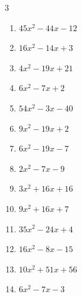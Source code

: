 \begin{multicols}{3}
\begin{enumerate}
  \item $45x^{2}-44x-12$

        \phantom{$=(5x-6)(9x+2)$}

  \item $16x^{2}-14x+3$

        \phantom{$=(2x-1)(8x-3)$}

\columnbreak %

  \item $4x^{2}-19x+21$

        \phantom{$=(x-3)(4x-7)$}

  \item $6x^{2}-7x+2$

        \phantom{$=(3x-2)(2x-1)$}

  \item $54x^{2}-3x-40$

        \phantom{$=(6x+5)(9x-8)$}

  \item $9x^{2}-19x+2$

        \phantom{$=(x-2)(9x-1)$}

  \item $6x^{2}-19x-7$

        \phantom{$=(3x+1)(2x-7)$}

  \item $2x^{2}-7x-9$

        \phantom{$=(2x-9)(x+1)$}

  \item $3x^{2}+16x+16$

        \phantom{$=(x+4)(3x+4)$}

  \item $9x^{2}+16x+7$

        \phantom{$=(9x+7)(x+1)$}

  \item $35x^{2}-24x+4$

        \phantom{$=(5x-2)(7x-2)$}

  \item $16x^{2}-8x-15$

        \phantom{$=(4x+3)(4x-5)$}

\columnbreak %

\resetques

  \item $10x^{2}+51x+56$

        \phantom{$=(5x+8)(2x+7)$}

  \item $6x^{2}-7x-3$


\end{enumerate}
\end{multicols}
